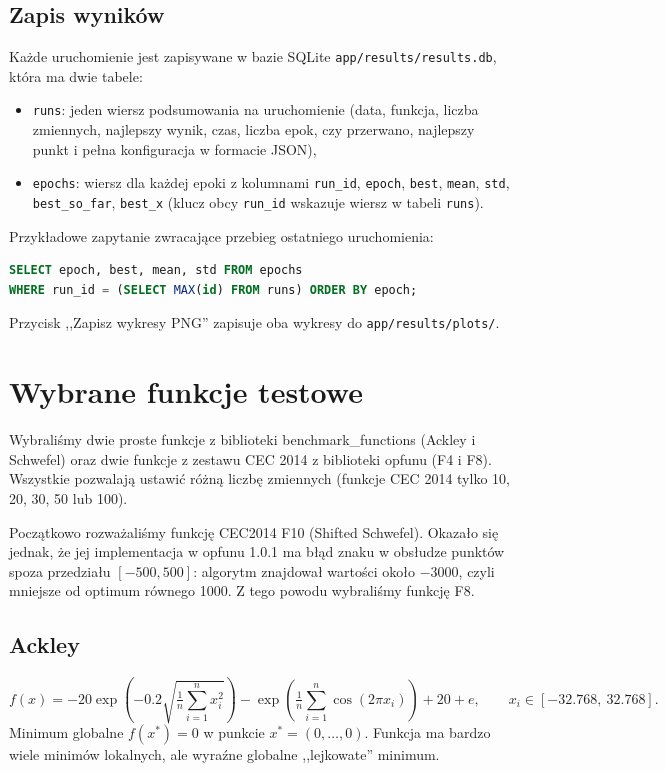 \documentclass[11pt,a4paper]{article}
\begin{document}
\subsection{Zapis wyników}
Każde uruchomienie jest zapisywane w bazie SQLite \texttt{app/results/results.db}, która ma dwie tabele:
\begin{itemize}
  \item \texttt{runs}: jeden wiersz podsumowania na uruchomienie (data, funkcja, liczba zmiennych,
        najlepszy wynik, czas, liczba epok, czy przerwano, najlepszy punkt i pełna konfiguracja w formacie JSON),
  \item \texttt{epochs}: wiersz dla każdej epoki z kolumnami \texttt{run\_id}, \texttt{epoch}, \texttt{best},
        \texttt{mean}, \texttt{std}, \texttt{best\_so\_far}, \texttt{best\_x}
        (klucz obcy \texttt{run\_id} wskazuje wiersz w tabeli \texttt{runs}).
\end{itemize}
Przykładowe zapytanie zwracające przebieg ostatniego uruchomienia:
\begin{lstlisting}[language=SQL]
SELECT epoch, best, mean, std FROM epochs
WHERE run_id = (SELECT MAX(id) FROM runs) ORDER BY epoch;
\end{lstlisting}
Przycisk ,,Zapisz wykresy PNG'' zapisuje oba wykresy do \texttt{app/results/plots/}.

\section{Wybrane funkcje testowe}

Wybraliśmy dwie proste funkcje z biblioteki benchmark\_functions (Ackley i Schwefel) oraz dwie
funkcje z zestawu CEC 2014 z biblioteki opfunu (F4 i F8). Wszystkie pozwalają ustawić różną liczbę
zmiennych (funkcje CEC 2014 tylko 10, 20, 30, 50 lub 100).

Początkowo rozważaliśmy funkcję CEC2014 F10 (Shifted Schwefel). Okazało się jednak, że jej
implementacja w opfunu 1.0.1 ma błąd znaku w obsłudze punktów spoza przedziału $[-500, 500]$:
algorytm znajdował wartości około $-3000$, czyli mniejsze od optimum równego 1000. Z tego powodu
wybraliśmy funkcję F8.

\subsection{Ackley}
\[
  f(x) = -20\exp\!\left(-0.2\sqrt{\tfrac{1}{n}\textstyle\sum_{i=1}^{n} x_i^2}\right)
         - \exp\!\left(\tfrac{1}{n}\textstyle\sum_{i=1}^{n}\cos(2\pi x_i)\right) + 20 + e,
  \qquad x_i \in [-32.768,\ 32.768].
\]
Minimum globalne $f(x^*) = 0$ w punkcie $x^* = (0, \ldots, 0)$. Funkcja ma bardzo wiele minimów
lokalnych, ale wyraźne globalne ,,lejkowate'' minimum.
\end{document}
